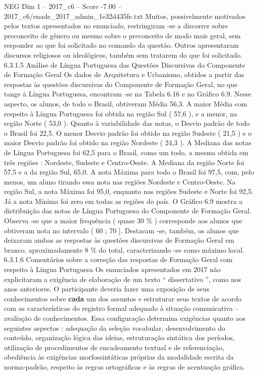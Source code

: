 \begin{textsample}{NEG Dim 1 – 2017\_c6 – Score -7.00 – 2017\_c6/enade\_2017\_admin\_1e32d435fe.txt}
Muitos, possivelmente motivados pelos textos apresentados no enunciado, restringiram -se a discorrer sobre preconceito de gênero ou mesmo sobre o preconceito de modo mais geral, sem responder ao que foi solicitado no comando da questão.
Outros apresentaram discursos religiosos ou ideológicos, também sem tratarem do que foi solicitado. 6.3.1.5 Análise de Língua Portuguesa das Questões Discursivas do Componente de Formação Geral Os dados de Arquitetura e Urbanismo, obtidos a partir das respostas às questões discursivas do Componente de Formação Geral, no que tange à Língua Portuguesa, encontram -se na Tabela 6.16 e no Gráfico 6.9.
Nesse aspecto, os alunos, de todo o Brasil, obtiveram Média 56,3.
A maior Média com respeito à Língua Portuguesa foi obtida na região Sul ( 57,6 ), e a menor, na região Norte ( 53,0 ).
Quanto à variabilidade das notas, o Desvio padrão de todo o Brasil foi 22,5.
O menor Desvio padrão foi obtido na região Sudeste ( 21,5 ) e o maior Desvio padrão foi obtido na região Nordeste ( 24,3 ).
A Mediana das notas de Língua Portuguesa foi 62,5 para o Brasil, como um todo, a mesma obtida em três regiões : Nordeste, Sudeste e Centro-Oeste.
A Mediana da região Norte foi 57,5 e a da região Sul, 65,0.
A nota Máxima para todo o Brasil foi 97,5, com, pelo menos, um aluno tirando essa nota nas regiões Nordeste e Centro-Oeste.
Na região Sul, a nota Máxima foi 95,0, enquanto nas regiões Sudeste e Norte foi 92,5.
Já a nota Mínima foi zero em todas as regiões do país.
O Gráfico 6.9 mostra a distribuição das notas de Língua Portuguesa do Componente de Formação Geral.
Observa -se que a maior frequência ( quase 30 \% ) corresponde aos alunos que obtiveram nota no intervalo ( 60 ; 70 ].
Destacam -se, também, os alunos que deixaram ambas as respostas às questões discursivas de Formação Geral em branco, aproximadamente 8 \% do total, caracterizando -se como máximo local. 6.3.1.6 Comentários sobre a correção das respostas de Formação Geral com respeito à Língua Portuguesa Os enunciados apresentados em 2017 não explicitaram a exigência de elaboração de um texto “ dissertativo ”, como nos anos anteriores.
O participante deveria fazer uma exposição de seus conhecimentos sobre \textbf{cada} um dos assuntos e estruturar seus textos de acordo com as características do registro formal adequado à situação comunicativa – avaliação de conhecimentos.
Essa configuração determina exigências quanto aos seguintes aspectos : adequação da seleção vocabular, desenvolvimento do conteúdo, organização lógica das ideias, estruturação sintática dos períodos, utilização de procedimentos de encadeamento textual e de referenciação, obediência às exigências morfossintáticas próprias da modalidade escrita da norma-padrão, respeito às regras ortográficas e às regras de acentuação gráfica.

\end{textsample}
